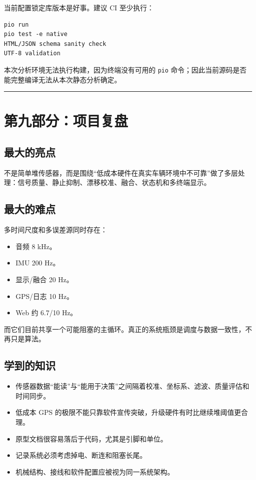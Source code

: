 \documentclass[
  UTF8,11pt,a4paper]{ctexart}
\newcommand{\passthrough}[1]{#1}
\providecommand{\tightlist}{%
  \setlength{\itemsep}{0pt}\setlength{\parskip}{0pt}}
\begin{document}
当前配置锁定库版本是好事。建议 CI 至少执行：

\begin{lstlisting}
pio run
pio test -e native
HTML/JSON schema sanity check
UTF-8 validation
\end{lstlisting}

本次分析环境无法执行构建，因为终端没有可用的
\passthrough{\lstinline!pio!}
命令；因此当前源码是否能完整编译无法从本次静态分析确定。

\begin{center}\rule{0.5\linewidth}{0.5pt}\end{center}

\section{第九部分：项目复盘}\label{ux7b2cux4e5dux90e8ux5206ux9879ux76eeux590dux76d8}

\subsection{最大的亮点}\label{ux6700ux5927ux7684ux4eaeux70b9}

不是简单堆传感器，而是围绕``低成本硬件在真实车辆环境中不可靠''做了多层处理：信号质量、静止抑制、漂移校准、融合、状态机和多终端显示。

\subsection{最大的难点}\label{ux6700ux5927ux7684ux96beux70b9}

多时间尺度和多误差源同时存在：

\begin{itemize}
\tightlist
\item
  音频 8 kHz。
\item
  IMU 200 Hz。
\item
  显示/融合 20 Hz。
\item
  GPS/日志 10 Hz。
\item
  Web 约 6.7/10 Hz。
\end{itemize}

而它们目前共享一个可能阻塞的主循环。真正的系统瓶颈是调度与数据一致性，不再只是算法。

\subsection{学到的知识}\label{ux5b66ux5230ux7684ux77e5ux8bc6}

\begin{itemize}
\tightlist
\item
  传感器数据``能读''与``能用于决策''之间隔着校准、坐标系、滤波、质量评估和时间同步。
\item
  低成本 GPS
  的极限不能只靠软件宣传突破，升级硬件有时比继续堆阈值更合理。
\item
  原型文档很容易落后于代码，尤其是引脚和单位。
\item
  记录系统必须考虑掉电、断连和阻塞长尾。
\item
  机械结构、接线和软件配置应被视为同一系统架构。
\end{itemize}
\end{document}
